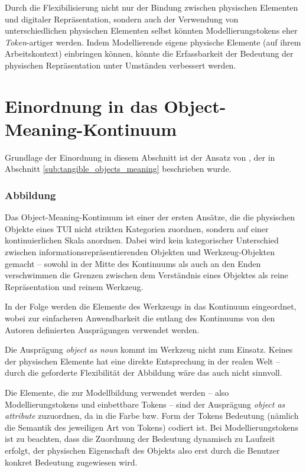 Durch die Flexibilisierung nicht nur der Bindung zwischen physischen Elementen und digitaler Repräsentation, sondern auch der Verwendung von unterschiedlichen physischen Elementen selbst könnten Modellierungstokens eher \emph{Token}-artiger werden. Indem Modellierende eigene physische Elemente (auf ihrem Arbeitskontext) einbringen können, könnte die Erfassbarkeit der Bedeutung der physischen Repräsentation unter Umständen verbessert werden.


\section{Einordnung in das Object-Meaning-Kontinuum} %
\label{sec:einordnung_in_das_object_meaning_kontinuum}

Grundlage der Einordnung in diesem Abschnitt ist der Ansatz von \citet{Underkoffler99}, der in Abschnitt \ref{sub:tangible_objects_meaning} beschrieben wurde.

\subsubsection{Abbildung} 

Das Object-Meaning-Kontinuum ist einer der ersten Ansätze, die die physischen Objekte eines \gls{TUI} nicht strikten Kategorien zuordnen, sondern auf einer kontinuierlichen Skala anordnen. Dabei wird kein kategorischer Unterschied zwischen informationsrepräsentierenden Objekten und Werkzeug-Objekten gemacht -- sowohl in der Mitte des Kontinuums als auch an den Enden verschwimmen die Grenzen zwischen dem Verständnis eines Objektes als reine Repräsentation und reinem Werkzeug. 

In der Folge werden die Elemente des Werkzeugs in das Kontinuum eingeordnet, wobei zur einfacheren Anwendbarkeit die entlang des Kontinuums von den Autoren definierten Ausprägungen verwendet werden.

Die Ausprägung \emph{object as noun} kommt im Werkzeug nicht zum Einsatz. Keines der physischen Elemente hat eine direkte Entsprechung in der realen Welt -- durch die geforderte Flexibilität der Abbildung wäre das auch nicht sinnvoll. 

Die Elemente, die zur Modellbildung verwendet werden -- also Modellierungstokens und einbettbare Tokens -- sind der Ausprägung \emph{object as attribute} zuzuordnen, da in die Farbe bzw. Form der Tokens Bedeutung (nämlich die Semantik des jeweiligen Art von Tokens) codiert ist. Bei Modellierungstokens ist zu beachten, dass die Zuordnung der Bedeutung dynamisch zu Laufzeit erfolgt, der physischen Eigenschaft des Objekts also erst durch die Benutzer konkret Bedeutung zugewiesen wird.

